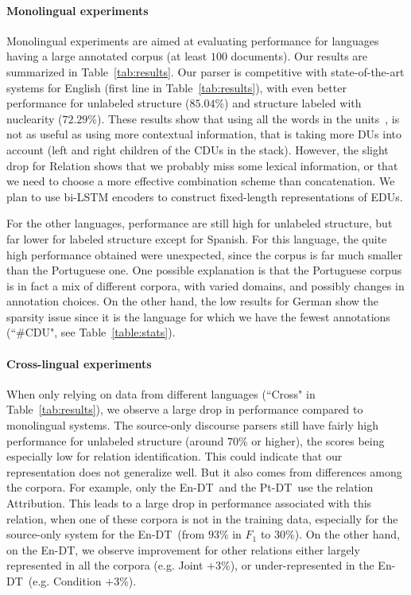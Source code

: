 \documentclass[11pt]{article}
\newcommand{\enrst}{En-DT}
\newcommand{\ptrst}{Pt-DT}
\newcommand{\crel}[1]{{\sc #1}\xspace}
\begin{document}
\paragraph{Monolingual experiments}
Monolingual experiments are aimed at evaluating performance for languages having a large annotated corpus (at least $100$ documents).
Our results are summarized in Table~\ref{tab:results}. 
Our parser is competitive with state-of-the-art systems for English (first line in Table~\ref{tab:results}), with even better performance for unlabeled structure ($85.04$\%) and structure labeled with nuclearity ($72.29$\%).
These results show that using all the words in the units~\cite{ji:representation:2014,li:recursive:2014}, is not as useful as using more contextual information, that is taking more DUs into account (left and right children of the CDUs in the stack). 
However, the slight drop for Relation shows that we probably miss some lexical information, or that we need to choose a more effective combination scheme than concatenation.
We plan to use bi-LSTM encoders \cite{Hochreiter:Schmidhuber:97} to construct fixed-length representations of EDUs.

For the other languages, performance are still high for unlabeled structure, but far lower for labeled structure except for Spanish.
For this language, the quite high performance obtained were unexpected, since the corpus is far much smaller than the Portuguese one.
One possible explanation is that the Portuguese corpus is in fact a mix of different corpora, with varied domains, and possibly changes in annotation choices. 
On the other hand, the low results for German show the sparsity issue since it is the language for which we have the fewest annotations (``\#CDU", see Table~\ref{table:stats}).


\paragraph{Cross-lingual experiments}
When only relying on data from different languages (``Cross" in Table~\ref{tab:results}), we observe a large drop in performance compared to monolingual systems.
The source-only discourse parsers still have fairly high performance for unlabeled structure (around $70$\% or higher), the scores being especially low for relation identification.
This could indicate that our representation does not generalize well.
But it also comes from differences among the corpora. For example, only the \enrst\ and the \ptrst\ use the relation \crel{Attribution}.
This leads to a large drop in performance associated with this relation, when one of these corpora is not in the training data, especially for the source-only system for the \enrst\ (from $93$\% in $F_1$ to $30$\%).
On the other hand, on the \enrst, we observe improvement for other relations either largely represented in all the corpora (e.g. \crel{Joint} $+3$\%), or under-represented in the \enrst\ (e.g. \crel{Condition} $+3$\%).
\end{document}
